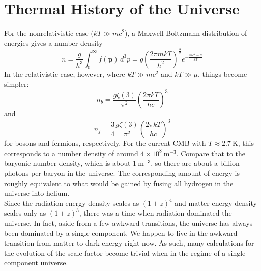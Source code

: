 \documentclass[10pt]{article}
\numberwithin{equation}{section}
\newcommand{\n}{\noindent}
\begin{document}

\section{Thermal History of the Universe} %
\label{sec:thermal_history_of_the_universe}
For the nonrelativistic case ($kT\gg mc^2$), a Maxwell-Boltzmann distribution of energies gives a number density 
\begin{equation}
	\label{eq:thermal:1} n = \frac{g}{h^3}\int_0^\infty f(\mathbf{p})\,d^3p = g\left(\frac{2\pi mkT}{h^2}\right)^{\frac{3}{2}} e^{-\frac{mc^2-\mu}{kT}}
\end{equation}
In the relativistic case, however, where $kT\gg mc^2$ and $kT\gg\mu$, things become simpler:
\begin{equation}
	\label{eq:thermal:2} n_b = \frac{g\zeta(3)}{\pi^2} \left(\frac{2\pi k T}{hc}\right)^3
\end{equation}
and
\begin{equation}
	\label{eq:thermal:3} n_f = \frac{3}{4}\frac{g\zeta(3)}{\pi^2} \left(\frac{2\pi k T}{hc}\right)^3
\end{equation}
for bosons and fermions, respectively. For the current CMB with $T\approx 2.7\ \mathrm{K}$, this corresponds to a number density of around $4\times 10^8\ \mathrm{m^{-3}}$. Compare that to the baryonic number density, which is about $1\ \mathrm{m^{-3}}$, so there are about a billion photons per baryon in the universe. The corresponding amount of energy is roughly equivalent to what would be gained by fusing all hydrogen in the universe into helium.\\

\n Since the radiation energy density scales as $(1+z)^4$ and matter energy density scales only as $(1+z)^3$, there was a time when radiation dominated the universe. In fact, aside from a few awkward transitions, the universe has always been dominated by a single component. We happen to live in the awkward transition from matter to dark energy right now. As such, many calculations for the evolution of the scale factor become trivial when in the regime of a single-component universe.
\end{document}
